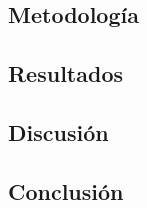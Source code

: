\documentclass{article}
\begin{document}
\subsection{Metodología}

\subsection{Resultados}
\setcounter{equation}{0}

\subsection{Discusión}

\subsection{Conclusión}
\end{document}
